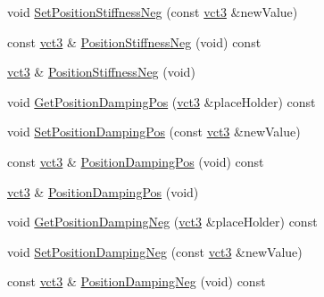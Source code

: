 \begin{DoxyCompactItemize}
\item 
void \hyperlink{classprm_fixture_gain_cartesian_set_af20086c9ad3e9302eee26f8021f1000e}{Set\+Position\+Stiffness\+Neg} (const \hyperlink{vct_fixed_size_vector_types_8h_a3af82acdbf4eeb73c551909240b106ea}{vct3} \&new\+Value)
\item 
const \hyperlink{vct_fixed_size_vector_types_8h_a3af82acdbf4eeb73c551909240b106ea}{vct3} \& \hyperlink{classprm_fixture_gain_cartesian_set_a891d31388bf8192eaac44ceecd5d8030}{Position\+Stiffness\+Neg} (void) const 
\item 
\hyperlink{vct_fixed_size_vector_types_8h_a3af82acdbf4eeb73c551909240b106ea}{vct3} \& \hyperlink{classprm_fixture_gain_cartesian_set_a1986f1b9acb79893d9d21b301fac40cf}{Position\+Stiffness\+Neg} (void)
\item 
void \hyperlink{classprm_fixture_gain_cartesian_set_a810c5926cd3f1d5cdb0fbe14e7c1f055}{Get\+Position\+Damping\+Pos} (\hyperlink{vct_fixed_size_vector_types_8h_a3af82acdbf4eeb73c551909240b106ea}{vct3} \&place\+Holder) const 
\item 
void \hyperlink{classprm_fixture_gain_cartesian_set_a7bf9ae58df70a804536fb37d03e41a5b}{Set\+Position\+Damping\+Pos} (const \hyperlink{vct_fixed_size_vector_types_8h_a3af82acdbf4eeb73c551909240b106ea}{vct3} \&new\+Value)
\item 
const \hyperlink{vct_fixed_size_vector_types_8h_a3af82acdbf4eeb73c551909240b106ea}{vct3} \& \hyperlink{classprm_fixture_gain_cartesian_set_a5f22007d55b6ebe8c7eb206fda12cc2d}{Position\+Damping\+Pos} (void) const 
\item 
\hyperlink{vct_fixed_size_vector_types_8h_a3af82acdbf4eeb73c551909240b106ea}{vct3} \& \hyperlink{classprm_fixture_gain_cartesian_set_a50b28ac97613f8d8d49c47d218c9c6f1}{Position\+Damping\+Pos} (void)
\item 
void \hyperlink{classprm_fixture_gain_cartesian_set_a67085d00946a53c8f7fb878d57f0a901}{Get\+Position\+Damping\+Neg} (\hyperlink{vct_fixed_size_vector_types_8h_a3af82acdbf4eeb73c551909240b106ea}{vct3} \&place\+Holder) const 
\item 
void \hyperlink{classprm_fixture_gain_cartesian_set_a944212c1d502b5c5109b892c9bfdfba3}{Set\+Position\+Damping\+Neg} (const \hyperlink{vct_fixed_size_vector_types_8h_a3af82acdbf4eeb73c551909240b106ea}{vct3} \&new\+Value)
\item 
const \hyperlink{vct_fixed_size_vector_types_8h_a3af82acdbf4eeb73c551909240b106ea}{vct3} \& \hyperlink{classprm_fixture_gain_cartesian_set_a180bc3decd66c8a95d932353473a827f}{Position\+Damping\+Neg} (void) const 

\end{DoxyCompactItemize}
